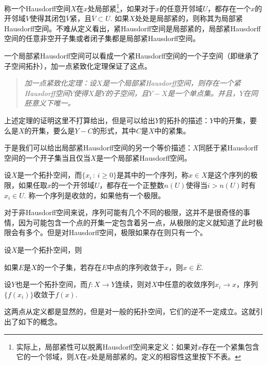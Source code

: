\begin{para}
称一个Hausdorff空间$X$在$x$处局部紧\footnote{实际上，局部紧性可以脱离Hausdorff空间来定义：如果对$x$存在一个紧集包含它的一个邻域，则$X$在$x$处是局部紧的。定义的相容性这里按下不表。}，如果对于$x$的任意开邻域$U$，都存在一个$x$的开邻域$V$使得其闭包$\overline{V}$紧，且$\overline{V}\subset U$. 如果$X$处处是局部紧的，则称其为局部紧Hausdorff空间。不难从定义看出，紧Hausdorff空间是局部紧的，局部紧Hausdorff空间的任意非空开子集或者闭子集都是局部紧Hausdorff空间。

一个局部紧Hausdorff空间可以看成一个紧Hausdorff空间的一个子空间（即继承了子空间拓扑），加一点紧致化定理保证了这点。
\begin{quote}\it
	加一点紧致化定理：设$X$是一个局部紧Hausdorff空间，则存在一个紧Hausdorff空间$Y$使得$X$是$Y$的子空间，且$Y-X$是一个单点集。并且，$Y$在同胚意义下唯一。
\end{quote}
上述定理的证明这里不打算给出，但是可以给出$Y$的拓扑的描述：$Y$中的开集，要么是$X$的开集，要么是$Y-C$的形式，其中$C$是$X$中的紧集。

于是我们可以给出局部紧Hausdorff空间的另一个等价描述：$X$同胚于紧Hausdorff空间的一个开子集当且仅当$X$是一个局部紧Hausdorff空间。
\end{para}

\begin{para}
	设$X$是一个拓扑空间，而$\{x_i\,:\, i\geq 0\}$是其中的一个序列，称$x\in X$是这个序列的极限，如果任取$x$的一个开邻域$U$，都存在一个正整数$n(U)$使得当$i>n(U)$时有$x_i\in U$. 称一个序列是收敛的，如果他有一个极限。

	对于非Hausdorff空间来说，序列可能有几个不同的极限，这并不是很奇怪的事情，因为可能包含一个点的开集一定包含着另一点，从极限的定义就知道了此时极限会有多个。但是对Hausdorff空间，极限如果存在则只有一个。
\end{para}

\begin{lem}
设$X$是一个拓扑空间，则
\begin{compactenum}[(a)]
\item 如果$E$是$X$的一个子集，若存在$E$中点的序列收敛于$x$，则$x\in \overline{E}$.
\item 设$Y$也是一个拓扑空间，而$f:X\to Y$连续，则对$X$中任意的收敛序列$x_i\to x$，序列$\{f(x_i)\}$收敛于$f(x)$.
\end{compactenum}
\end{lem}

这两点从定义都是显然的，但是对一般的拓扑空间，它们的逆不一定成立。这就引出了如下的概念。

